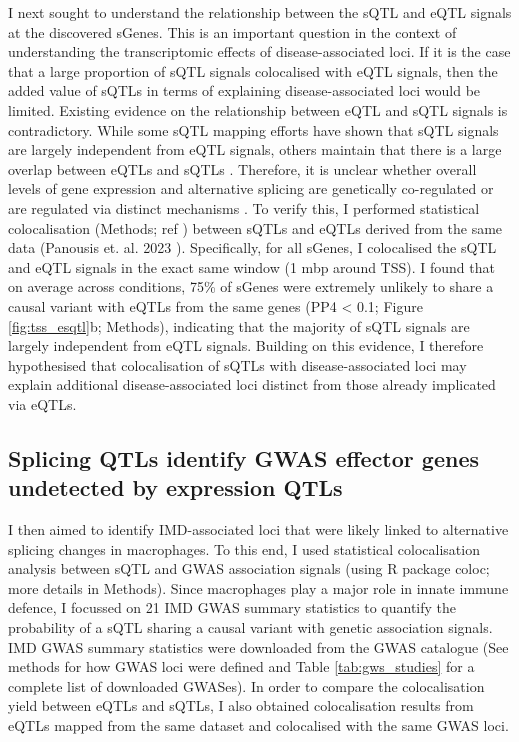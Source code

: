 I next sought to understand the relationship between the sQTL and eQTL signals at the discovered sGenes. This is an important question in the context of understanding the transcriptomic effects of disease-associated loci. If it is the case that a large proportion of sQTL signals colocalised with eQTL signals, then the added value of sQTLs in terms of explaining disease-associated loci would be limited. Existing evidence on the relationship between eQTL and sQTL signals is contradictory. While some sQTL mapping efforts have shown that sQTL signals are largely independent from eQTL signals, others maintain that there is a large overlap between eQTLs and sQTLs \cite{Garrido-Martin2021-sk,Kim-Hellmuth2020-gz,Wang2008-fb,Lappalainen2013-mz}. Therefore, it is unclear whether overall levels of gene expression and alternative splicing are genetically co-regulated or are regulated via distinct mechanisms \cite{Kim-Hellmuth2020-gz,Wang2008-fb,Lappalainen2013-mz}. To verify this, I performed statistical colocalisation (Methods; ref \cite{Giambartolomei2014-yl}) between sQTLs and eQTLs derived from the same data (Panousis et. al. 2023 \cite{macromap-eqtl}). Specifically, for all sGenes, I colocalised the sQTL and eQTL signals in the exact same window (1 mbp around TSS). I found that on average across conditions, 75\% of sGenes were extremely unlikely to share a causal variant with eQTLs from the same genes (PP4 < 0.1; Figure \ref{fig:tss_esqtl}b; Methods), indicating that the majority of sQTL signals are largely independent from eQTL signals. Building on this evidence, I therefore hypothesised that colocalisation of sQTLs with disease-associated loci may explain additional disease-associated loci distinct from those already implicated via eQTLs. \\




\subsection{Splicing QTLs identify GWAS effector genes undetected by expression QTLs}


I then aimed to identify IMD-associated loci that were likely linked to alternative splicing changes in macrophages. To this end, I used statistical colocalisation analysis between sQTL and GWAS association signals (using R package coloc; more details in Methods). Since macrophages play a major role in innate immune defence, I focussed on 21 IMD GWAS summary statistics to quantify the probability of a sQTL sharing a causal variant with genetic association signals. IMD GWAS summary statistics were downloaded from the GWAS catalogue \cite{Buniello2019-wb} (See methods for how GWAS loci were defined and Table \ref{tab:gws_studies} for a complete list of downloaded GWASes). In order to compare the colocalisation yield between eQTLs and sQTLs, I also obtained colocalisation results from eQTLs mapped from the same dataset and colocalised with the same GWAS loci.\\


